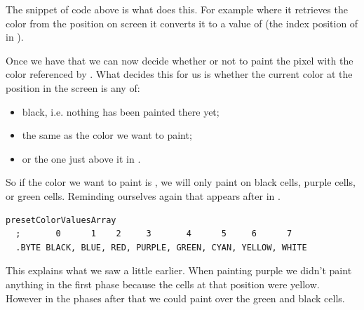 The snippet of code above is what does this. For example where it retrieves the color  from the position on screen
it converts it to a value of  (the index position of  in ).

Once we have that we can now decide whether or not to paint the pixel with the color referenced by .
What decides this for us is whether the current color at the position in the screen is any of:
\begin{itemize}
  \item black, i.e. nothing has been painted there yet;
  \item the same as the color we want to paint;
  \item or the one just above it in .
\end{itemize}

So if the color we want to paint is , we will only paint on black cells, purple cells, or green cells. Reminding ourselves
again that  appears after  in .

\begin{lstlisting}
presetColorValuesArray
  ;       0      1    2     3       4      5     6      7
  .BYTE BLACK, BLUE, RED, PURPLE, GREEN, CYAN, YELLOW, WHITE
\end{lstlisting}

This explains what we saw a little earlier. When painting purple we didn't paint anything in the first phase because the cells at that position
were yellow. However in the phases after that we could paint over the green and black cells.

